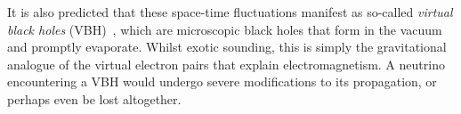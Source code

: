 \documentclass[a4paper,11pt]{article}
\begin{document}
It is also predicted that these space-time fluctuations manifest as so-called \textit{virtual black holes} (VBH)~\cite{Hawking1982,PhysRevD.53.3099}, which are microscopic black holes that form in the vacuum and promptly evaporate. Whilst exotic sounding, this is simply the gravitational analogue of the virtual electron pairs that explain electromagnetism. A neutrino encountering a VBH would undergo severe modifications to its propagation, or perhaps even be lost altogether.










\end{document}
